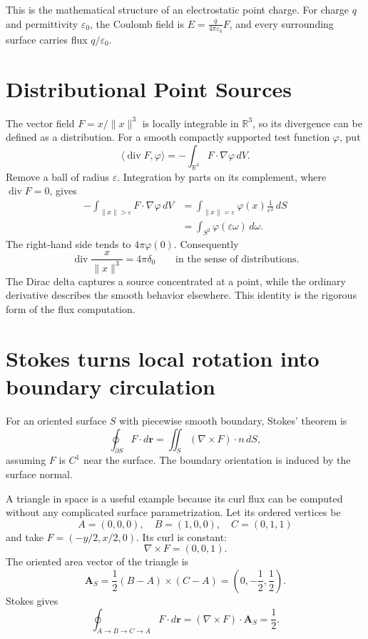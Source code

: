 This is the mathematical structure of an electrostatic point charge. For charge \(q\) and permittivity \(\varepsilon_0\), the Coulomb field is \(E=\frac{q}{4\pi\varepsilon_0}F\), and every surrounding surface carries flux \(q/\varepsilon_0\).

\section{Distributional Point Sources}

The vector field \(F=x/\|x\|^3\) is locally integrable in \(\mathbb R^3\), so its divergence can be defined as a distribution. For a smooth compactly supported test function \(\varphi\), put
\[
 \langle\operatorname{div}F,\varphi\rangle
 =-\int_{\mathbb R^3}F\cdot\nabla\varphi\,dV.
\]
Remove a ball of radius \(\varepsilon\). Integration by parts on its complement, where \(\operatorname{div}F=0\), gives
\[
\begin{aligned}
 -\int_{\|x\|>\varepsilon}F\cdot\nabla\varphi\,dV
 &=\int_{\|x\|=\varepsilon}
       \varphi(x)\frac1{\varepsilon^2}\,dS\\
 &=\int_{S^2}\varphi(\varepsilon\omega)\,d\omega.
\end{aligned}
\]
The right-hand side tends to \(4\pi\varphi(0)\). Consequently
\[
 \boxed{\operatorname{div}\frac{x}{\|x\|^3}=4\pi\delta_0}
 \qquad\text{in the sense of distributions}.
\]
The Dirac delta captures a source concentrated at a point, while the ordinary derivative describes the smooth behavior elsewhere. This identity is the rigorous form of the flux computation.

\section{Stokes turns local rotation into boundary circulation}

For an oriented surface \(S\) with piecewise smooth boundary, Stokes' theorem is
\[
 \boxed{\oint_{\partial S}F\cdot d\mathbf r
 =\iint_S(\nabla\times F)\cdot n\,dS,}
\]
assuming \(F\) is \(C^1\) near the surface. The boundary orientation is induced by the surface normal.

A triangle in space is a useful example because its curl flux can be computed without any complicated surface parametrization. Let its ordered vertices be
\[
 A=(0,0,0),\quad B=(1,0,0),\quad C=(0,1,1)
\]
and take \(F=(-y/2,x/2,0)\). Its curl is constant:
\[
 \nabla\times F=(0,0,1).
\]
The oriented area vector of the triangle is
\[
 \mathbf A_S=\frac12(B-A)\times(C-A)
             =\left(0,-\frac12,\frac12\right).
\]
Stokes gives
\[
 \oint_{A\to B\to C\to A}F\cdot d\mathbf r
 =(\nabla\times F)\cdot\mathbf A_S=\frac12.
\]

